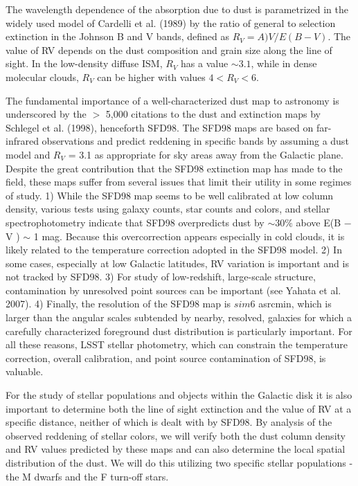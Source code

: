 The wavelength dependence of the absorption due to dust is parametrized in the widely used model
of Cardelli et al. (1989) by the ratio of general to selection extinction in the Johnson B and V
bands, defined as $R_V = A)V /E(B − V)$. The value of RV depends on the dust composition and
grain size along the line of sight. In the low-density diffuse ISM, $R_V$ has a value $\sim 3.1$, while in
dense molecular clouds, $R_V$ can be higher with values $4 < R_V < 6$.

The fundamental importance of a well-characterized dust map to astronomy is underscored by the
$>$ 5,000 citations to the dust and extinction maps by Schlegel et al. (1998), henceforth SFD98.
The SFD98 maps are based on far-infrared observations and predict reddening in specific bands by
assuming a dust model and $R_V$ = 3.1 as appropriate for sky areas away from the Galactic plane.
Despite the great contribution that the SFD98 extinction map has made to the field, these maps
suffer from several issues that limit their utility in some regimes of study. 1) While the SFD98
map seems to be well calibrated at low column density, various tests using galaxy counts, star
counts and colors, and stellar spectrophotometry indicate that SFD98 overpredicts dust by $\sim30\%$
above E(B − V ) $\sim$ 1 mag. Because this overcorrection appears especially in cold clouds, it is
likely related to the temperature correction adopted in the SFD98 model. 2) In some cases,
especially at low Galactic latitudes, RV variation is important and is not tracked by SFD98. 3)
For study of low-redshift, large-scale structure, contamination by unresolved point sources can be
important (see Yahata et al. 2007). 4) Finally, the resolution of the SFD98 map is $sim 6$ asrcmin, which
is larger than the angular scales subtended by nearby, resolved, galaxies for which a carefully
characterized foreground dust distribution is particularly important. For all these reasons, LSST
stellar photometry, which can constrain the temperature correction, overall calibration, and point
source contamination of SFD98, is valuable.

For the study of stellar populations and objects within the Galactic disk it is also important to
determine both the line of sight extinction and the value of RV at a specific distance, neither of
which is dealt with by SFD98. By analysis of the observed reddening of stellar colors, we will verify
both the dust column density and RV values predicted by these maps and can also determine the
local spatial distribution of the dust. We will do this utilizing two specific stellar populations - the
M dwarfs and the F turn-off stars.

